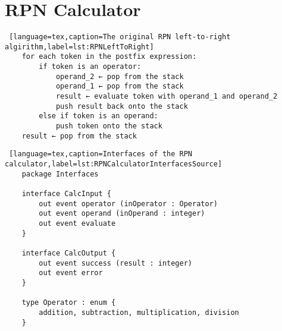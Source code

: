 \newpage
\section{RPN Calculator}

\begin{lstlisting} [language=tex,caption=The original RPN left-to-right algirithm,label=lst:RPNLeftToRight]
	for each token in the postfix expression:
		if token is an operator:
			operand_2 ← pop from the stack
			operand_1 ← pop from the stack
			result ← evaluate token with operand_1 and operand_2
			push result back onto the stack
		else if token is an operand:
			push token onto the stack
	result ← pop from the stack
\end{lstlisting}

\bigskip
\begin{lstlisting} [language=tex,caption=Interfaces of the RPN calculator,label=lst:RPNCalculatorInterfacesSource]
	package Interfaces
	
	interface CalcInput {
		out event operator (inOperator : Operator)
		out event operand (inOperand : integer)
		out event evaluate
	}
	
	interface CalcOutput {
		out event success (result : integer)
		out event error
	}
	
	type Operator : enum {
		addition, subtraction, multiplication, division
	}
\end{lstlisting}

